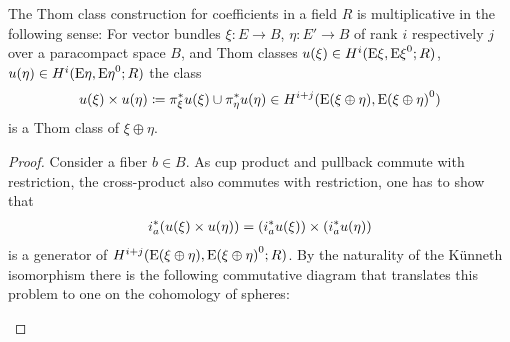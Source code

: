 \begin{Cor}\label{thomclassmultiplicative} %
  The Thom class construction for coefficients in a field $R$ is
  multiplicative in the following sense:
  For vector bundles $\xi\colon E\to B$, $\eta\colon E'\to B$
  of rank $i$ respectively $j$ over a paracompact space $B$, and Thom
  classes
  $u(\xi)\in H^i(\mathrm{E}\xi, {\mathrm{E}\xi}^0; R)$,
  $u(\eta)\in H^i(\mathrm{E}\eta, {\mathrm{E}\eta}^0; R)$
  the class
  \begin{gather*}
    u(\xi)\times u(\eta)
    \coloneqq {\pi}^*_\xi u(\xi) \cup {\pi}^*_\eta u(\eta)
    \in H^{i+j}(\mathrm{E}(\xi\oplus\eta), {\mathrm{E}(\xi\oplus\eta)}^0)
  \end{gather*}
  is a Thom class of $\xi\oplus\eta$.
  \begin{proof}
    Consider a fiber $b\in B$. As cup product and pullback commute
    with restriction, the cross-product also commutes with
    restriction, \idest one has to show that
    \begin{gather*}
      {i}^*_a(u(\xi)\times u(\eta))
      = \left({i}^*_au(\xi)\right)
      \times \left({i}^*_au(\eta)\right)
    \end{gather*}
    is a generator of
    $H^{i+j}(\mathrm{E}(\xi\oplus\eta), {\mathrm{E}(\xi\oplus\eta)}^0;R)$.
    By the naturality of the Künneth isomorphism there is the
    following commutative diagram that translates this problem to one
    on the cohomology of spheres:
    \begin{center}
\end{center}
\end{proof}
\end{Cor}
